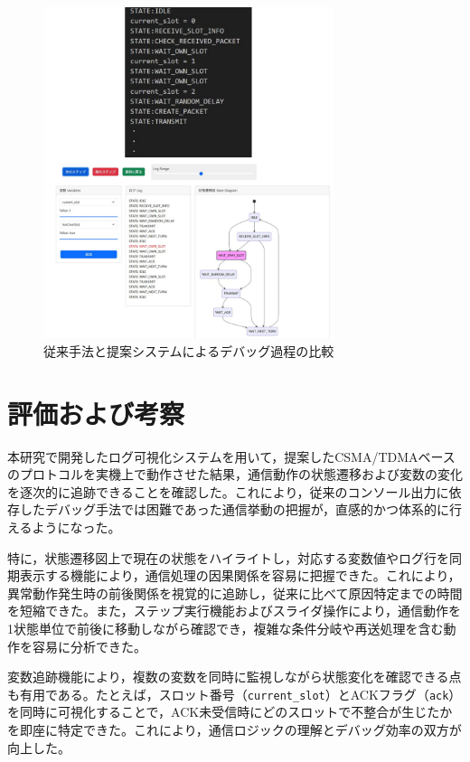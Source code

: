\documentclass[technicalreport]{ieicej}
\begin{document}
\begin{figure}[tb]
  \centering
  \includegraphics[width=85mm]{./images/3_debug_comparison.pdf}
  \caption{従来手法と提案システムによるデバッグ過程の比較}
  \label{fig:debug-comparison}
\end{figure}




\section{評価および考察}
本研究で開発したログ可視化システムを用いて，提案したCSMA/TDMAベースのプロトコルを実機上で動作させた結果，通信動作の状態遷移および変数の変化を逐次的に追跡できることを確認した。これにより，従来のコンソール出力に依存したデバッグ手法では困難であった通信挙動の把握が，直感的かつ体系的に行えるようになった。

特に，状態遷移図上で現在の状態をハイライトし，対応する変数値やログ行を同期表示する機能により，通信処理の因果関係を容易に把握できた。これにより，異常動作発生時の前後関係を視覚的に追跡し，従来に比べて原因特定までの時間を短縮できた。また，ステップ実行機能およびスライダ操作により，通信動作を1状態単位で前後に移動しながら確認でき，複雑な条件分岐や再送処理を含む動作を容易に分析できた。

変数追跡機能により，複数の変数を同時に監視しながら状態変化を確認できる点も有用である。たとえば，スロット番号（\texttt{current\_slot}）とACKフラグ（\texttt{ack}）を同時に可視化することで，ACK未受信時にどのスロットで不整合が生じたかを即座に特定できた。これにより，通信ロジックの理解とデバッグ効率の双方が向上した。
\end{document}
